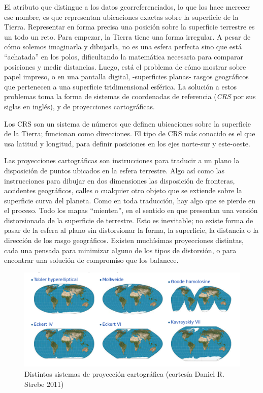 \documentclass[spanish,]{book}
\begin{document}
El atributo que distingue a los datos georreferenciados, lo que los hace merecer ese nombre, es que representan ubicaciones exactas sobre la superficie de la Tierra. Representar en forma precisa una posición sobre la superficie terrestre es un todo un reto. Para empezar, la Tierra tiene una forma irregular. A pesar de cómo solemos imaginarla y dibujarla, no es una esfera perfecta sino que está ``achatada'' en los polos, dificultando la matemática necesaria para comparar posiciones y medir distancias. Luego, está el problema de cómo mostrar sobre papel impreso, o en una pantalla digital, -superficies planas- rasgos geográficos que pertenecen a una superficie tridimensional esférica. La solución a estos problemas toma la forma de sistemas de coordenadas de referencia (\emph{CRS} por sus siglas en inglés), y de proyecciones cartográficas.

Los CRS son un sistema de números que definen ubicaciones sobre la superficie de la Tierra; funcionan como direcciones. El tipo de CRS más conocido es el que usa latitud y longitud, para definir posiciones en los ejes norte-sur y este-oeste.

Las proyecciones cartográficas son instrucciones para traducir a un plano la disposición de puntos ubicados en la esfera terrestre. Algo así como las instrucciones para dibujar en dos dimensiones las disposición de fronteras, accidentes geográficos, calles o cualquier otro objeto que se extiende sobre la superficie curva del planeta. Como en toda traducción, hay algo que se pierde en el proceso. Todo los mapas ``mienten'', en el sentido en que presentan una versión distorsionada de la superficie de terrestre. Esto es inevitable; no existe forma de pasar de la esfera al plano sin distorsionar la forma, la superficie, la distancia o la dirección de los rasgo geográficos. Existen muchísimas proyecciones distintas, cada una pensada para minimizar alguno de los tipos de distorsión, o para encontrar una solución de compromiso que los balancee.

\begin{figure}
\includegraphics[width=1\linewidth]{imagenes/proyecciones} \caption{Distintos sistemas de proyección cartográfica (cortesía Daniel R. Strebe 2011)}\label{fig:unnamed-chunk-143}
\end{figure}
\end{document}
